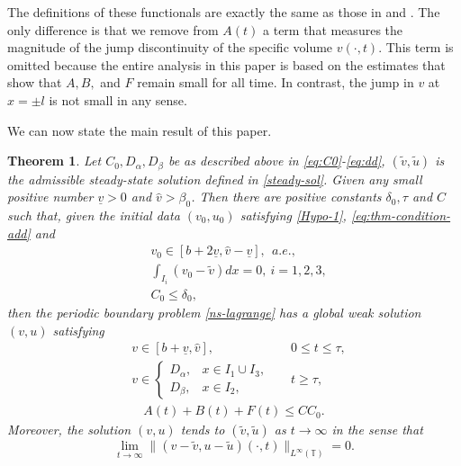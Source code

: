 \documentclass[a4paper,oneside,11pt]{article}
\numberwithin{equation}{section}
\newtheorem{theorem}{Theorem}[section]
\begin{document}
The definitions of these functionals are exactly the same as those in \cite{hoff1991} and \cite{hoff1992}. The only difference is that we remove from $A(t)$ a term that measures the magnitude of the jump discontinuity of the specific volume $v(\cdot, t)$. This term is omitted because the entire analysis in this paper is based on the estimates that show that $A, B,$ and $F$ remain small for all time. In contrast, the jump in $v$ at $x = \pm l$ is not small in any sense.


We can now state the main result of this paper.

\begin{theorem}\label{thm1} Let $C_0, D_\alpha, D_\beta$ be as described above in \eqref{eq:C0}-\eqref{eq:dd}, $(\tilde{v},\tilde{u})$ is the admissible steady-state solution defined in \eqref{steady-sol}.  Given any small positive number $\underline{v}>0$ and $\hat{v}>\beta_0$. Then there are positive constants $\delta_0,\tau$ and $C$ such that, given the initial data $(v_0,u_0)$  satisfying \eqref{Hypo-1}, \eqref{eq:thm-condition-add} and
\begin{align}
	& v_0\in [b+2\underline{v},\hat{v}-\underline{v}],~~a.e., \label{eq:vv-b0}\\
	& \int_{I_i}(v_0-\tilde{v})dx=0,~i=1,2,3,\label{eq:add-b0} \\	
&C_0%
	\leq \delta_0, \label{eq:e0-b0}
\end{align}	
then the periodic boundary problem \eqref{ns-lagrange} has a global weak solution $(v,u)$ %
 satisfying
\begin{align}
&v \in  [b+\underline{v},\hat{v}], &&  0\leq t\leq \tau,\label{eq:vv-b11}\\
&v \in 
\begin{cases}
D_\alpha, & x \in I_1 \cup I_3, \\
D_\beta, & x \in I_2,
\end{cases}  && t\geq \tau, \label{eq:vv-b1}\end{align}
\begin{align} \displaystyle A(t)+B(t)+F(t)\leq CC_0. \label{eq:e0-b1}
\end{align}
Moreover, the solution $(v,u)$ tends to $(\tilde{v},\tilde{u})$ as $t\rightarrow\infty$ in the sense that
\begin{equation}\label{large-time}
\lim_{t\rightarrow\infty}\|(v-\tilde{v},u-\tilde{u})(\cdot,t)\|_{L^\infty(\mathbb{T})}=0.
\end{equation}
\end{theorem}
\end{document}
